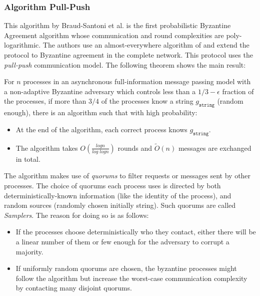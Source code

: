 




\subsubsection{Algorithm Pull-Push \cite{BGH13}}
This algorithm by Braud-Santoni et al. \cite{BGH13} is the first probabilistic Byzantine Agreement algorithm whose communication and round complexities are poly-logarithmic. The authors use an almost-everywhere algorithm of \cite{KSSV06} and extend the protocol to Byzantine agreement in the complete network. This protocol uses the \textit{pull-push} communication model. The following theorem shows the main result: 


\begin{theorem}
For $n$ processes in an asynchronous full-information message passing model with a non-adaptive Byzantine adversary which controls less than a $1/3 - \epsilon$ fraction of the processes, if more than $3/4$ of the processes know a string $g_{\mathtt{string}}$ (random enough), there is an algorithm such that with high probability:
\begin{itemize}
\item At the end of the algorithm, each correct process knows $g_{\mathtt{string}}$.
\item The algorithm takes $O(\frac{logn}{log \; logn})$ rounds and $\tilde{O}(n)$ messages are exchanged in total. 
\end{itemize}
\end{theorem}

The algorithm makes use of \textit{quorums} to filter requests or messages sent by other processes. The choice of quorums each process uses is directed by both deterministically-known information (like the identity of the process), and random sources (randomly chosen initially string). Such quorums are called \textit{Samplers}. The reason for doing so is as follows:
\begin{itemize}
\item If the processes choose deterministically who they contact, either there will be a linear number of them or few enough for the adversary to corrupt a majority. 
\item If uniformly random quorums are chosen, the byzantine processes might follow the algorithm but increase the worst-case communication complexity by contacting many disjoint quorums. 
\end{itemize}

